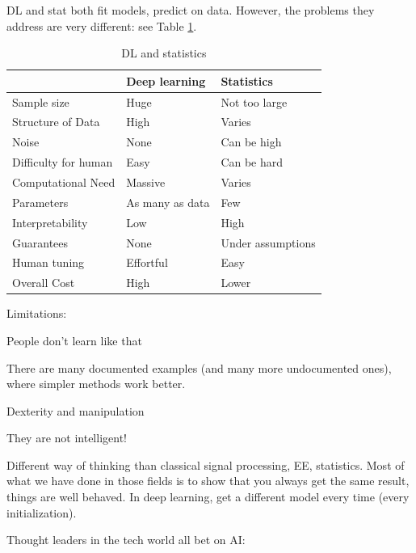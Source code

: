 \documentclass[english]{article}
\begin{document}
DL and stat both fit models, predict on data. However, the problems they address are very different: see Table \ref{my-label}.  

\renewcommand{\arraystretch}{1.5}
\begin{table}[]
\centering

\caption{DL and statistics}
\label{my-label}
\begin{tabular}{|l|l|l|}
\hline
                     & Deep learning & Statistics  \\ \hline
Sample size          & Huge          & Not too large       \\\hline  
Structure of Data       & High          & Varies      \\ \hline
Noise       & None          & Can be high      \\ \hline
Difficulty for human & Easy          & Can be hard \\ \hline
Computational Need        & Massive       & Varies      \\ \hline
Parameters    & As many as data          & Few        \\ \hline
Interpretability     & Low           & High        \\ \hline
Guarantees     & None           & Under assumptions        \\ \hline
Human tuning              & Effortful     & Easy        \\ \hline
Overall Cost         & High          & Lower         \\ \hline
\end{tabular}
\end{table}

\item  Limitations: 

People don't learn like that

There are many documented examples (and many more undocumented ones), where simpler methods work better. 

Dexterity and manipulation 

They are not intelligent!

\item Different way of thinking than classical signal processing, EE, statistics. Most of what we have done in those fields is to show that you always get the same result, things are well behaved. In deep learning, get a different model every time (every initialization).

\item Thought leaders in the tech world all bet on AI: 
\end{document}
